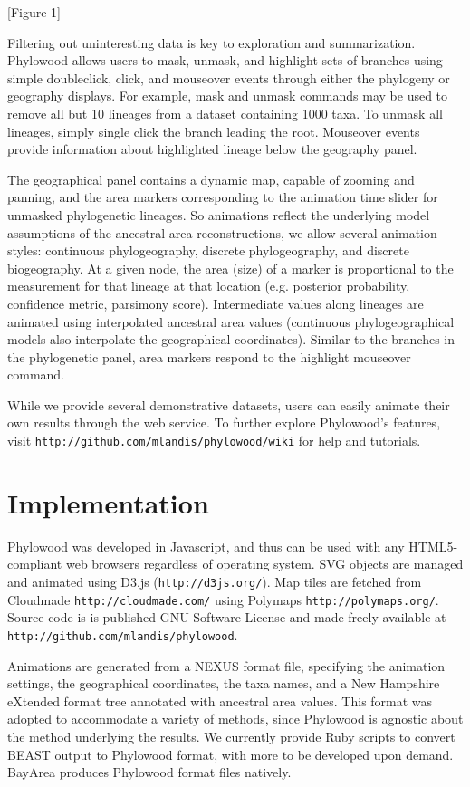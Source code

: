 \documentclass[11pt]{article}
\begin{document}
[Figure 1]

Filtering out uninteresting data is key to exploration and summarization. Phylowood allows users to mask, unmask, and highlight sets of branches using simple doubleclick, click, and mouseover events through either the phylogeny or geography displays. For example, mask and unmask commands may be used to remove all but 10 lineages from a dataset containing 1000 taxa. To unmask all lineages, simply single click the branch leading the root. Mouseover events provide information about highlighted lineage below the geography panel.


The geographical panel contains a dynamic map, capable of zooming and panning, and the area markers corresponding to the animation time slider for unmasked phylogenetic lineages. So animations reflect the underlying model assumptions of the ancestral area reconstructions, we allow several animation styles: continuous phylogeography, discrete phylogeography, and discrete biogeography. At a given node, the area (size) of a marker is proportional to the measurement for that lineage at that location (e.g. posterior probability, confidence metric, parsimony score). Intermediate values along lineages are animated using interpolated ancestral area values (continuous phylogeographical models also interpolate the geographical coordinates). Similar to the branches in the phylogenetic panel, area markers respond to the highlight mouseover command.

While we provide several demonstrative datasets, users can easily animate their own results through the web service. To further explore Phylowood's features, visit \texttt{http://github.com/mlandis/phylowood/wiki} for help and tutorials.

\section{Implementation}

Phylowood was developed in Javascript, and thus can be used with any HTML5-compliant web browsers regardless of operating system. SVG objects are managed and animated using D3.js (\texttt{http://d3js.org/}). Map tiles are fetched from Cloudmade \texttt{http://cloudmade.com/} using Polymaps \texttt{http://polymaps.org/}. Source code is is published GNU Software License and made freely available at \texttt{http://github.com/mlandis/phylowood}.

Animations are generated from a NEXUS format file, specifying the animation settings, the geographical coordinates, the taxa names, and a New Hampshire eXtended format tree annotated with ancestral area values. This format was adopted to accommodate a variety of methods, since Phylowood is agnostic about the method underlying the results. We currently provide Ruby scripts to convert BEAST output to Phylowood format, with more to be developed upon demand. BayArea produces Phylowood format files natively.
\end{document}

